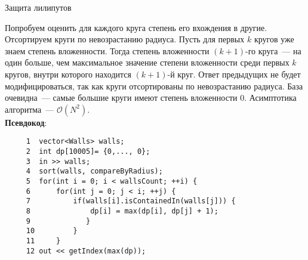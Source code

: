 \begin{tutorial}{Защита лилипутов}

Попробуем оценить для каждого круга степень его вхождения в другие. Отсортируем круги по невозрастанию радиуса. Пусть для первых $k$ кругов уже знаем степень вложенности. Тогда степень вложенности $(k+1)$-го круга~--- на один больше, чем максимальное значение степени вложенности среди первых $k$ кругов, внутри которого находится $(k+1)$-й круг. Ответ предыдущих не будет модифицироваться, так как круги отсортированы по невозрастанию радиуса. База очевидна~--- самые большие круги имеют степень вложенности $0$. Асимптотика алгоритма~--- $\mathcal{O}(N^2)$.
\newline
\\
\textbf{Псевдокод}:
\begin{verbatim}
     1  vector<Walls> walls;
     2  int dp[10005]= {0,..., 0};
     3  in >> walls;
     4  sort(walls, compareByRadius);
     5  for(int i = 0; i < wallsCount; ++i) {
     6      for(int j = 0; j < i; ++j) {
     7          if(walls[i].isContainedIn(walls[j])) {
     8              dp[i] = max(dp[i], dp[j] + 1);
     9             }
     10         }
     11     }
     12 out << getIndex(max(dp));
\end{verbatim}


\end{tutorial}
